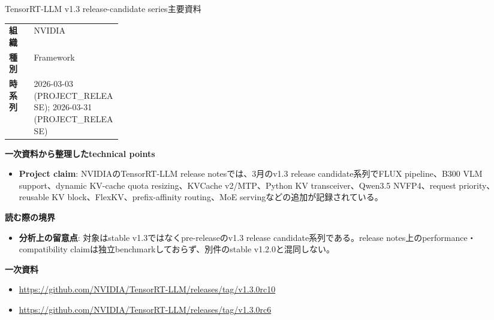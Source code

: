 \begin{technicalnote}{TensorRT-LLM v1.3 release-candidate series}{主要資料}
\begingroup
\begin{tabularx}{\linewidth}{@{}>{\bfseries}p{0.22\linewidth}X@{}}
組織 & NVIDIA \\
種別 & Framework \\
時系列 & 2026-03-03 (PROJECT\_RELEASE); 2026-03-31 (PROJECT\_RELEASE) \\
\end{tabularx}
\smallskip
{\bfseries 一次資料から整理したtechnical points}
\begin{itemize}[leftmargin=1.5em,itemsep=0.35em]
\item \textbf{Project claim}: NVIDIAのTensorRT-LLM release notesでは、3月のv1.3 release candidate系列でFLUX pipeline、B300 VLM support、dynamic KV-cache quota resizing、KVCache v2/MTP、Python KV transceiver、Qwen3.5 NVFP4、request priority、reusable KV block、FlexKV、prefix-affinity routing、MoE servingなどの追加が記録されている。
\end{itemize}
\begin{minipage}{\linewidth}
{\bfseries 読む際の境界}
\begin{itemize}[leftmargin=1.5em,itemsep=0.35em]
\item \textbf{分析上の留意点}: 対象はstable v1.3ではなくpre-releaseのv1.3 release candidate系列である。release notes上のperformance・compatibility claimは独立benchmarkしておらず、別件のstable v1.2.0と混同しない。
\end{itemize}
\begin{samepage}
{\bfseries 一次資料}
\begingroup\sloppy
\begin{itemize}[leftmargin=1.5em,itemsep=0.25em]
\item {\scriptsize\url{https://github.com/NVIDIA/TensorRT-LLM/releases/tag/v1.3.0rc10}}
\item {\scriptsize\url{https://github.com/NVIDIA/TensorRT-LLM/releases/tag/v1.3.0rc6}}
\end{itemize}
\endgroup
\end{samepage}
\end{minipage}
\endgroup
\end{technicalnote}
\medskip

